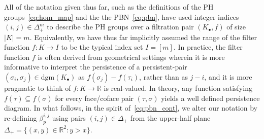 \documentclass[10pt]{article}
\newcommand{\+}{%
	\raisebox{0.18ex}{\scaleobj{0.55}{+}}
}
\theoremstyle{definition}
\begin{document}
All of the notation given thus far, such as the definitions of the PH groups~\eqref{eq:hom_map} and the the PBN~\eqref{eq:pbn}, have used integer indices $(i,j) \in \Delta_+^m$ to describe the PH groups over a filtration pair $(K_\bullet, f)$ of size $\lvert K \rvert = m$. Equivalently, we have thus far implicitly assumed the range of the filter function $f : K \to I$ to be the typical index set $I = [m]$.
In practice, the filter function $f$ is often derived from geometrical settings wherein it is more informative to interpret the persistence of a persistent-pair $(\sigma_i, \sigma_j) \in \mathrm{dgm}(K_\bullet)$ as $f(\sigma_j) - f(\tau_i)$, rather than as $j - i$, and it is more pragmatic to think of  $f : K \to \mathbb{R}$ is real-valued.
 In theory, any function satisfying $f(\tau) \subseteq f(\sigma)$ for every face/coface pair $(\tau, \sigma)$ yields a well defined persistence diagram. 
In what follows, in the spirit of~\eqref{eq:pbn_cont}, we alter our notation by re-defining $\beta_p^{i,j}$ using pairs $(i,j) \in \Delta_{+}$ from the upper-half plane $\Delta_{+} = \{ (x,y) \in \mathbb{R}^2 : y > x \} $.

\end{document}
